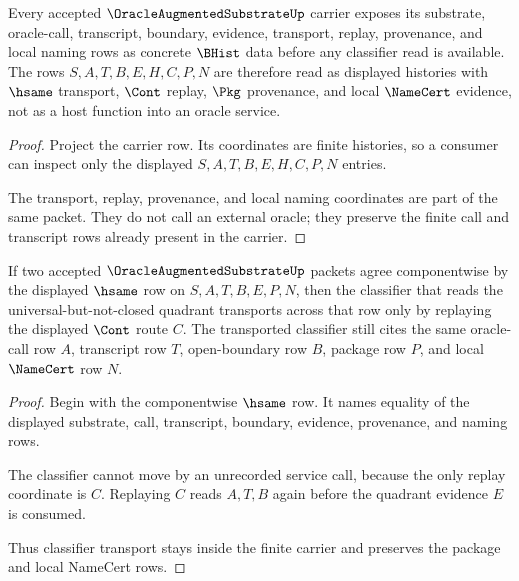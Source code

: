 \begin{theorem}
\label{thm:oracle-augmented-substrate-carrier-row-exposure}
Every accepted $\OracleAugmentedSubstrateUp$ carrier exposes its substrate, oracle-call, transcript, boundary, evidence, transport, replay, provenance, and local naming rows as concrete $\BHist$ data before any classifier read is available. The rows $S,A,T,B,E,H,C,P,N$ are therefore read as displayed histories with $\hsame$ transport, $\Cont$ replay, $\Pkg$ provenance, and local $\NameCert$ evidence, not as a host function into an oracle service.
\end{theorem}
\begin{proof}
Project the carrier row. Its coordinates are finite histories, so a consumer can inspect only the displayed $S,A,T,B,E,H,C,P,N$ entries.

The transport, replay, provenance, and local naming coordinates are part of the same packet. They do not call an external oracle; they preserve the finite call and transcript rows already present in the carrier.
\end{proof}

\begin{theorem}
\label{thm:oracle-augmented-substrate-classifier-transport}
If two accepted $\OracleAugmentedSubstrateUp$ packets agree componentwise by the displayed $\hsame$ row on $S,A,T,B,E,P,N$, then the classifier that reads the universal-but-not-closed quadrant transports across that row only by replaying the displayed $\Cont$ route $C$. The transported classifier still cites the same oracle-call row $A$, transcript row $T$, open-boundary row $B$, package row $P$, and local $\NameCert$ row $N$.
\end{theorem}
\begin{proof}
Begin with the componentwise $\hsame$ row. It names equality of the displayed substrate, call, transcript, boundary, evidence, provenance, and naming rows.

The classifier cannot move by an unrecorded service call, because the only replay coordinate is $C$. Replaying $C$ reads $A,T,B$ again before the quadrant evidence $E$ is consumed.

Thus classifier transport stays inside the finite carrier and preserves the package and local NameCert rows.
\end{proof}

